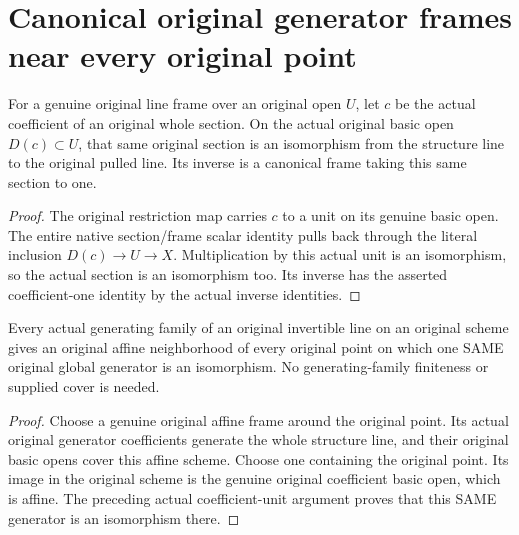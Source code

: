 \section{Canonical original generator frames near every original point}

\begin{theorem}
\label{thm:fc-generator-section-unit-neighborhood}
\leanok
{}
For a genuine original line frame over an original open $U$, let
$c$ be the actual coefficient of an original whole section. On the
actual original basic open $D(c)\subset U$, that same original
section is an isomorphism from the structure line to the original
pulled line. Its inverse is a canonical frame taking this same
section to one.
\end{theorem}
\begin{proof}
The original restriction map carries $c$ to a unit on its genuine
basic open. The entire native section/frame scalar identity pulls
back through the literal inclusion $D(c)\to U\to X$. Multiplication
by this actual unit is an isomorphism, so the actual section is an
isomorphism too. Its inverse has the asserted coefficient-one
identity by the actual inverse identities.
\end{proof}

\begin{theorem}
\label{thm:fc-generator-section-frame-cover}
\leanok
{}
Every actual generating family of an original invertible line on
an original scheme gives an original affine neighborhood of every
original point on which one SAME original global generator is an
isomorphism. No generating-family finiteness or supplied cover is
needed.
\end{theorem}
\begin{proof}
Choose a genuine original affine frame around the original point.
Its actual original generator coefficients generate the whole
structure line, and their original basic opens cover this affine
scheme. Choose one containing the original point. Its image in the
original scheme is the genuine original coefficient basic open,
which is affine. The preceding actual coefficient-unit argument
proves that this SAME generator is an isomorphism there.
\end{proof}
